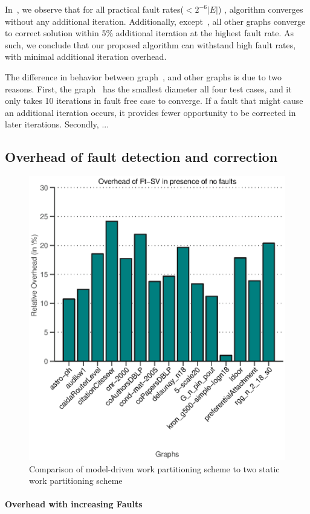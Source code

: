 In~, we observe that for all practical fault rates($<2^{-6}|E|$) , algorithm converges without any additional iteration.
Additionally, except~, all other graphs converge to correct solution within 5\% additional iteration at the highest fault rate. As such, we conclude that our proposed algorithm can withstand high fault rates, with minimal additional iteration overhead.   

The difference in behavior between graph~, and other graphs is due to two reasons. First, the graph~ has  the smallest diameter all four test cases, and it only takes 10 iterations in fault free case to converge. If a fault that might cause an additional iteration occurs, it provides fewer opportunity to be corrected in later iterations. Secondly, ...

\subsection{Overhead of fault detection and correction}

\begin{figure}[ht]
\includegraphics[width=.6\textwidth]{plots/plot_zero_overhead.eps}
\caption{\label{fig:zero-oh-plot} 
\small Comparison of model-driven work partitioning scheme to
two static work partitioning scheme}
\end{figure}

\paragraph{Overhead with increasing Faults}


